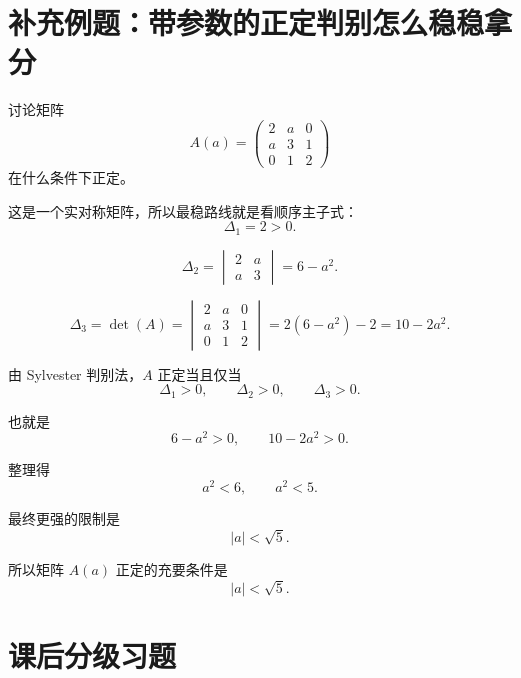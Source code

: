 \documentclass[11pt,oneside,UTF8]{ctexbook}
\begin{document}
\section{补充例题：带参数的正定判别怎么稳稳拿分}

\begin{examplebox}
讨论矩阵
\[
A(a)=
\begin{pmatrix}
2&a&0\\
a&3&1\\
0&1&2
\end{pmatrix}
\]
在什么条件下正定。

\tcblower

这是一个实对称矩阵，所以最稳路线就是看顺序主子式：
\[
\Delta_1=2>0.
\]

\[
\Delta_2=
\begin{vmatrix}
2&a\\
a&3
\end{vmatrix}
=6-a^2.
\]

\[
\Delta_3=\det(A)
=
\begin{vmatrix}
2&a&0\\
a&3&1\\
0&1&2
\end{vmatrix}
=2(6-a^2)-2=10-2a^2.
\]

由 Sylvester 判别法，\(A\) 正定当且仅当
\[
\Delta_1>0,\qquad \Delta_2>0,\qquad \Delta_3>0.
\]

也就是
\[
6-a^2>0,\qquad 10-2a^2>0.
\]

整理得
\[
a^2<6,\qquad a^2<5.
\]

最终更强的限制是
\[
|a|<\sqrt5.
\]

所以矩阵 \(A(a)\) 正定的充要条件是
\[
\boxed{|a|<\sqrt5}.
\]
\end{examplebox}

\section{课后分级习题}
\end{document}

